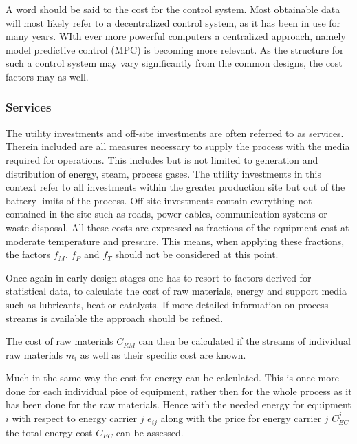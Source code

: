 A word should be said to the cost for the control system. Most obtainable data will most likely refer to
a decentralized control system, as it has been in use for many years. WIth ever more powerful computers
a centralized approach, namely model predictive control (MPC) is becoming more relevant. As the
structure for such a control system may vary significantly from the common designs, the cost factors may
as well.

\subsubsection{Services}
The utility investments and off-site investments are often referred to as services. Therein included are
all measures necessary to supply the process with the media required for operations. This includes but is
not limited to generation and distribution of energy, steam, process gases. The utility investments
in this context refer to all investments within the greater production site but out of the battery limits of the
process. Off-site investments contain everything not contained in the site such as roads, power cables,
communication systems or waste disposal. All these costs are expressed as fractions of the equipment
cost at moderate temperature and pressure. This means, when applying these fractions, the factors $f_M$,
$f_P$ and $f_T$ should not be considered at this point.

Once again in early design stages one has to resort to factors derived for statistical data, to calculate
the cost of raw materials, energy and support media such as lubricants, heat or catalysts. If more
detailed information on process streams is available the approach should be refined.

The cost of raw materials $C_{RM}$ can then be calculated if the streams of individual raw materials
$m_i$ as well as their specific cost are known.
%

Much in the same way the cost for energy can be calculated. This is once more done for each individual
pice of equipment, rather then for the whole process as it has been done for the raw materials. Hence
with the needed energy for equipment $i$ with respect to energy carrier $j$ $e_{ij}$ along with
the price for energy carrier $j$ $C_{EC}^j$ the total energy cost $C_{EC}$ can be assessed.
%

